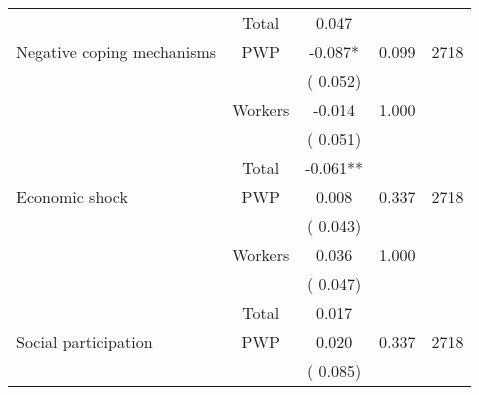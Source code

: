 \begin{tabular}{l*{4}{c}}
\cmidrule{2-3}
                               &       Total           &              0.047               &   &                                               \\ 
\cmidrule{2-3}
 Negative coping mechanisms                &       PWP     &             -0.087*               &        0.099   & 2718                              \\ 
                               &                               &       (       0.052)                     & &                                                                             \\ 
                               &       Workers         &             -0.014               &        1.000   &                                               \\ 
                               &                               &       (       0.051)                     & &                                                                             \\ 
\cmidrule{2-3}
                               &       Total           &             -0.061**               &   &                                               \\ 
\cmidrule{2-3}
 Economic shock                &       PWP     &              0.008               &        0.337   & 2718                              \\ 
                               &                               &       (       0.043)                     & &                                                                             \\ 
                               &       Workers         &              0.036               &        1.000   &                                               \\ 
                               &                               &       (       0.047)                     & &                                                                             \\ 
\cmidrule{2-3}
                               &       Total           &              0.017               &   &                                               \\ 
\cmidrule{2-3}
 Social participation                &       PWP     &              0.020               &        0.337   & 2718                              \\ 
                               &                               &       (       0.085)                     & &                                                                             \\ 

\end{tabular}
